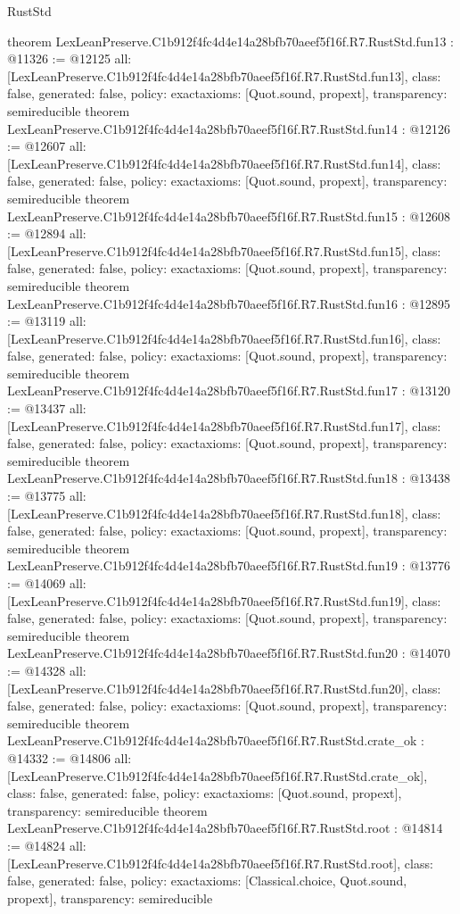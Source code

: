 \begin{lexlean}{RustStd}
\begin{coremodule}
{}
theorem LexLeanPreserve.C1b912f4fc4d4e14a28bfb70aeef5f16f.R7.RustStd.fun13 : @11326 := @12125 {
  all: [LexLeanPreserve.C1b912f4fc4d4e14a28bfb70aeef5f16f.R7.RustStd.fun13],
  class: false,
  generated: false,
  policy: exact{axioms: [Quot.sound, propext]},
  transparency: semireducible
}
theorem LexLeanPreserve.C1b912f4fc4d4e14a28bfb70aeef5f16f.R7.RustStd.fun14 : @12126 := @12607 {
  all: [LexLeanPreserve.C1b912f4fc4d4e14a28bfb70aeef5f16f.R7.RustStd.fun14],
  class: false,
  generated: false,
  policy: exact{axioms: [Quot.sound, propext]},
  transparency: semireducible
}
theorem LexLeanPreserve.C1b912f4fc4d4e14a28bfb70aeef5f16f.R7.RustStd.fun15 : @12608 := @12894 {
  all: [LexLeanPreserve.C1b912f4fc4d4e14a28bfb70aeef5f16f.R7.RustStd.fun15],
  class: false,
  generated: false,
  policy: exact{axioms: [Quot.sound, propext]},
  transparency: semireducible
}
theorem LexLeanPreserve.C1b912f4fc4d4e14a28bfb70aeef5f16f.R7.RustStd.fun16 : @12895 := @13119 {
  all: [LexLeanPreserve.C1b912f4fc4d4e14a28bfb70aeef5f16f.R7.RustStd.fun16],
  class: false,
  generated: false,
  policy: exact{axioms: [Quot.sound, propext]},
  transparency: semireducible
}
theorem LexLeanPreserve.C1b912f4fc4d4e14a28bfb70aeef5f16f.R7.RustStd.fun17 : @13120 := @13437 {
  all: [LexLeanPreserve.C1b912f4fc4d4e14a28bfb70aeef5f16f.R7.RustStd.fun17],
  class: false,
  generated: false,
  policy: exact{axioms: [Quot.sound, propext]},
  transparency: semireducible
}
theorem LexLeanPreserve.C1b912f4fc4d4e14a28bfb70aeef5f16f.R7.RustStd.fun18 : @13438 := @13775 {
  all: [LexLeanPreserve.C1b912f4fc4d4e14a28bfb70aeef5f16f.R7.RustStd.fun18],
  class: false,
  generated: false,
  policy: exact{axioms: [Quot.sound, propext]},
  transparency: semireducible
}
theorem LexLeanPreserve.C1b912f4fc4d4e14a28bfb70aeef5f16f.R7.RustStd.fun19 : @13776 := @14069 {
  all: [LexLeanPreserve.C1b912f4fc4d4e14a28bfb70aeef5f16f.R7.RustStd.fun19],
  class: false,
  generated: false,
  policy: exact{axioms: [Quot.sound, propext]},
  transparency: semireducible
}
theorem LexLeanPreserve.C1b912f4fc4d4e14a28bfb70aeef5f16f.R7.RustStd.fun20 : @14070 := @14328 {
  all: [LexLeanPreserve.C1b912f4fc4d4e14a28bfb70aeef5f16f.R7.RustStd.fun20],
  class: false,
  generated: false,
  policy: exact{axioms: [Quot.sound, propext]},
  transparency: semireducible
}
theorem LexLeanPreserve.C1b912f4fc4d4e14a28bfb70aeef5f16f.R7.RustStd.crate_ok : @14332 := @14806 {
  all: [LexLeanPreserve.C1b912f4fc4d4e14a28bfb70aeef5f16f.R7.RustStd.crate_ok],
  class: false,
  generated: false,
  policy: exact{axioms: [Quot.sound, propext]},
  transparency: semireducible
}
theorem LexLeanPreserve.C1b912f4fc4d4e14a28bfb70aeef5f16f.R7.RustStd.root : @14814 := @14824 {
  all: [LexLeanPreserve.C1b912f4fc4d4e14a28bfb70aeef5f16f.R7.RustStd.root],
  class: false,
  generated: false,
  policy: exact{axioms: [Classical.choice, Quot.sound, propext]},
  transparency: semireducible
}


\end{coremodule}
\end{lexlean}
